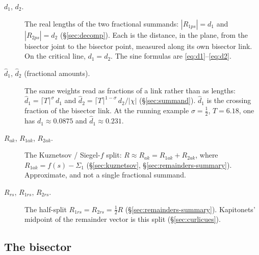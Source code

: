 \documentclass[11pt]{article}
\theoremstyle{definition}
\begin{document}
\begin{description}
\item[$d_1$, $d_2$.]
The real lengths of the two fractional summands:
$|R_{1ps}|=d_1$ and $|R_{2ps}|=d_2$
(\S\ref{sec:decomp}).
Each is the distance, in the plane, from the bisector joint to the
bisector point, measured along its own bisector link.
On the critical line, $d_1=d_2$.
The sine formulas are \eqref{eq:d1}--\eqref{eq:d2}.

\item[$\hat d_1$, $\hat d_2$ (fractional amounts).]
The same weights read as fractions of a link rather than as
lengths:
$\hat d_1=\lceil T\rceil^{\sigma}\,d_1$ and
$\hat d_2=\lceil T\rceil^{1-\sigma}\,d_2/|\chi|$
(\S\ref{sec:summand}).
$\hat d_1$ is the crossing fraction of the bisector link.
At the running example $\sigma=\tfrac12$, $T=6.18$, one has
$d_1\approx0.0875$ and $\hat d_1\approx0.231$.

\item[$R_{ak}$, $R_{1ak}$, $R_{2ak}$.]
The Kuznetsov / Siegel-$f$ split:
$R\approx R_{ak}=R_{1ak}+R_{2ak}$, where
$R_{1ak}=f(s)-\Sigma_1$
(\S\ref{sec:kuznetsov}, \S\ref{sec:remainders-summary}).
Approximate, and not a single fractional summand.

\item[$R_{rs}$, $R_{1rs}$, $R_{2rs}$.]
The half-split $R_{1rs}=R_{2rs}=\tfrac12 R$
(\S\ref{sec:remainders-summary}).
Kapitonets' midpoint of the remainder vector is this split
(\S\ref{sec:curlicues}).
\end{description}

\subsection*{The bisector}
\end{document}
